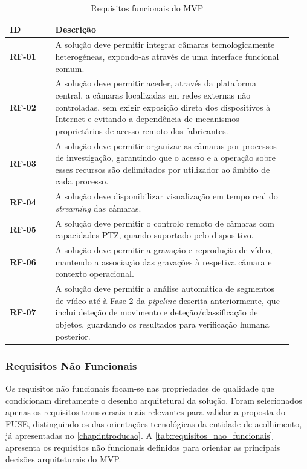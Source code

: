 \begin{table}[H]
    \centering
    \caption{Requisitos funcionais do \gls{MVP}}
    \label{tab:requisitos_funcionais}
    \begin{tabular}{p{0.15\linewidth} p{0.78\linewidth}}
        \toprule
        \textbf{ID} & \textbf{Descrição} \\
        \midrule
        \textbf{RF-01} & A solução deve permitir integrar câmaras tecnologicamente heterogéneas, expondo-as através de uma interface funcional comum. \\
        \textbf{RF-02} & A solução deve permitir aceder, através da plataforma central, a câmaras localizadas em redes externas não controladas, sem exigir exposição direta dos dispositivos à Internet e evitando a dependência de mecanismos proprietários de acesso remoto dos fabricantes. \\
        \textbf{RF-03} & A solução deve permitir organizar as câmaras por processos de investigação, garantindo que o acesso e a operação sobre esses recursos são delimitados por utilizador ao âmbito de cada processo. \\
        \textbf{RF-04} & A solução deve disponibilizar visualização em tempo real do \textit{streaming} das câmaras. \\
        \textbf{RF-05} & A solução deve permitir o controlo remoto de câmaras com capacidades \gls{PTZ}, quando suportado pelo dispositivo. \\
        \textbf{RF-06} & A solução deve permitir a gravação e reprodução de vídeo, mantendo a associação das gravações à respetiva câmara e contexto operacional. \\
        \textbf{RF-07} & A solução deve permitir a análise automática de segmentos de vídeo até à Fase 2 da \textit{pipeline} descrita anteriormente, que inclui deteção de movimento e deteção/classificação de objetos, guardando os resultados para verificação humana posterior. \\
        \bottomrule
    \end{tabular}
\end{table}

\subsubsection{Requisitos Não Funcionais}

Os requisitos não funcionais focam-se nas propriedades de qualidade que condicionam diretamente o desenho arquitetural da solução. Foram selecionados apenas os requisitos transversais mais relevantes para validar a proposta do \gls{FUSE}, distinguindo-os das orientações tecnológicas da entidade de acolhimento, já apresentadas no \autoref{chap:introducao}. A \autoref{tab:requisitos_nao_funcionais} apresenta os requisitos não funcionais definidos para orientar as principais decisões arquiteturais do \gls{MVP}.

